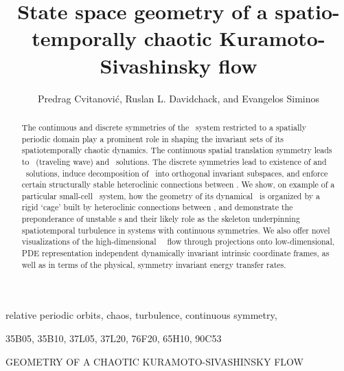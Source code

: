 \documentclass[final]{siamltex}
\begin{document}
                \title{
State space geometry of a spatio-temporally chaotic
Kuramoto-Sivashinsky flow
                 }
                  \author{
Predrag Cvitanovi\'c\footnotemark[1],
Ruslan L. Davidchack\footnotemark[2],
    and
Evangelos Siminos\footnotemark[1]
                    }

                \maketitle

\renewcommand{\thefootnote}{\fnsymbol{footnote}}
\renewcommand{\thefootnote}{\arabic{footnote}}

                \begin{abstract}
The continuous and discrete symmetries of the \KS\ system
restricted to a spatially periodic domain play a prominent
role in shaping the invariant sets of its
spatiotemporally chaotic dynamics.
The continuous spatial
translation symmetry leads to
\reqva\ (traveling wave) and \rpo\ solutions.
The discrete symmetries lead to existence of
{\eqv} and \po\ solutions,
induce decomposition
of \statesp\ into orthogonal invariant subspaces, and
enforce certain
structurally stable heteroclinic connections between \eqva.
We show, on example of a particular small-cell \KS\ system,
how the geometry of its dynamical \statesp\ is organized by a rigid
`cage' built by heteroclinic connections between \eqva, 
and demonstrate the preponderance of unstable \rpo s and their likely
role as the skeleton underpinning spatiotemporal turbulence in systems
with continuous symmetries.
We also offer novel visualizations of the high-dimensional
\KS\ \statesp\ flow
through projections onto low-dimensional,
PDE representation independent
dynamically invariant intrinsic coordinate frames,
as well as in terms of the physical, symmetry invariant
energy transfer rates.
                \end{abstract}

\begin{keywords}
relative periodic orbits, chaos, turbulence, continuous symmetry, {\KSe}
\end{keywords}

\begin{AMS}
35B05, 35B10, 37L05, 37L20, 76F20, 65H10, 90C53
\end{AMS}

\pagestyle{myheadings}
\thispagestyle{plain}
         {GEOMETRY OF A CHAOTIC KURAMOTO-SIVASHINSKY FLOW}








\appendix






\end{document}

